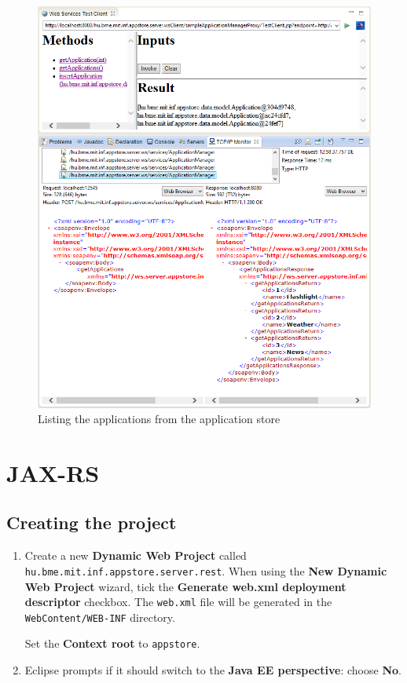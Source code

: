 \documentclass[]{report}
\let\Oldincludegraphics\includegraphics
\renewcommand{\includegraphics}[1]{
\begin{adjustbox}{max size={\textwidth}{\textheight}}
    \Oldincludegraphics[scale=0.6]{#1}%
\end{adjustbox}
}
\begin{document}
\begin{enumerate}
  \begin{figure}[htbp]
  \centering
  \includegraphics{img/web_services/tcp_ip_monitor_list.png}
  \caption{Listing the applications from the application store}
  \end{figure}
\end{enumerate}

\section{JAX-RS}

\subsection{Creating the project}

\begin{enumerate}
\def\labelenumi{\arabic{enumi}.}
\item
  Create a new \textbf{Dynamic Web Project} called
  \texttt{hu.bme.mit.inf.appstore.server.rest}. When using the
  \textbf{New Dynamic Web Project} wizard, tick the \textbf{Generate
  web.xml deployment descriptor} checkbox. The \texttt{web.xml} file
  will be generated in the \texttt{WebContent/WEB-INF} directory.

  Set the \textbf{Context root} to \texttt{appstore}.
\item
  Eclipse prompts if it should switch to the \textbf{Java EE
  perspective}: choose \textbf{No}.
\end{enumerate}
\end{document}
